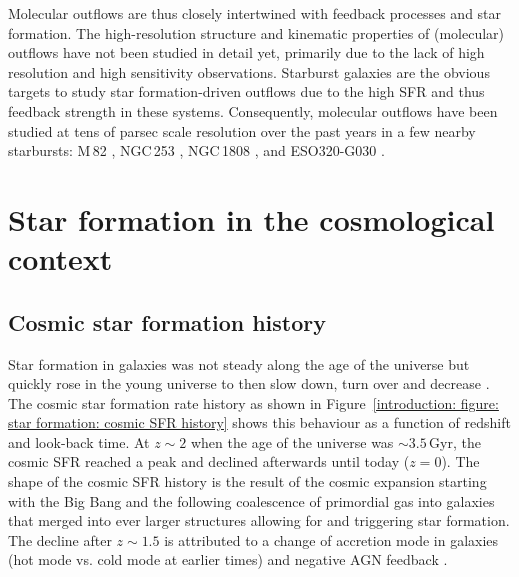 Molecular outflows are thus closely intertwined with feedback processes and star formation. The high-resolution structure and kinematic properties of (molecular) outflows have not been studied in detail yet, primarily due to the lack of high resolution and high sensitivity observations. Starburst galaxies are the obvious targets to study star formation-driven outflows due to the high SFR and thus feedback strength in these systems. Consequently, molecular outflows have been studied at tens of parsec scale resolution over the past years in a few nearby starbursts: 
M\,82 \citep{2002ApJ...580L..21W,2015ApJ...814...83L}, NGC\,253 \citep{2013Natur.499..450B,2017ApJ...835..265W,2018ApJ...867..111Z}, NGC\,1808 \citep{2018ApJ...856...97S}, and ESO320-G030 \citep{2016A&A...594A..81P}.



\section{Star formation in the cosmological context}
\label{introduction: section: star formation: cosmological context}

\subsection{Cosmic star formation history}

Star formation in galaxies was not steady along the age of the universe but quickly rose in the young universe to then slow down, turn over and decrease \citep[review by][and references therein]{2014ARA&A..52..415M}. The cosmic star formation rate history as shown in Figure~\ref{introduction: figure: star formation: cosmic SFR history} shows this behaviour as a function of redshift and look-back time. At $z\sim2$ when the age of the universe was $\sim 3.5$\,Gyr, the cosmic SFR reached a peak and declined afterwards until today ($z=0$). The shape of the cosmic SFR history is the result of the cosmic expansion starting with the Big Bang and the following coalescence of primordial gas into galaxies that merged into ever larger structures allowing for and triggering star formation. The decline after $z \sim 1.5$ is attributed to a change of accretion mode in galaxies (hot mode vs. cold mode at earlier times) and negative AGN feedback \citep[e.g.][]{2011MNRAS.415.2782V}.

